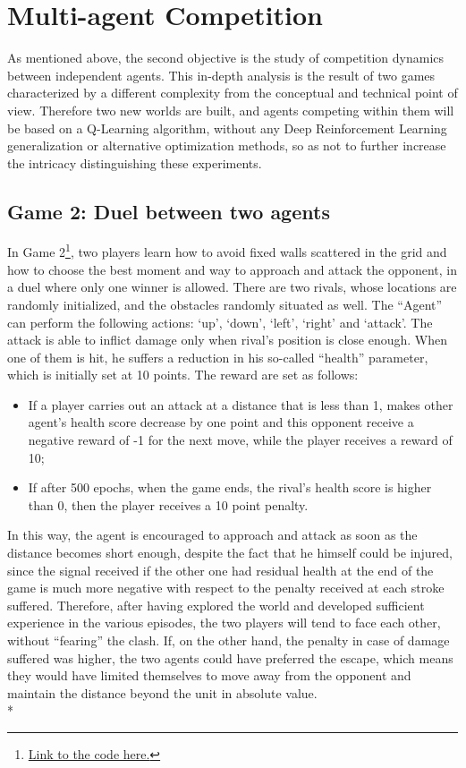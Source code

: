 \section{Multi-agent Competition}
As mentioned above, the second objective is the study of competition dynamics between independent agents. This in-depth analysis is the result of two games characterized by a different complexity from the conceptual and technical point of view. Therefore two new worlds are built, and agents competing within them will be based on a Q-Learning algorithm, without any Deep Reinforcement Learning generalization or alternative optimization methods, so as not to further increase the intricacy distinguishing these experiments.
\subsection{Game 2: Duel between two agents}
In Game 2\footnote{\href{https://github.com/moiraghif/DragonHunting/tree/master/Duel}{Link to the code here.}}, two players learn how to avoid fixed walls scattered in the grid and how to choose the best moment and way to approach and attack the opponent, in a duel where only one winner is allowed. There are two rivals, whose locations are randomly initialized, and the obstacles randomly situated as well. 
The ``Agent'' can perform the following actions: `up', `down', `left', `right' and `attack'. The attack is able to inflict damage only when rival's position is close enough. When one of them is hit, he suffers a reduction in his so-called ``health'' parameter, which is initially set at 10 points. The reward are set as follows:
\begin{itemize}[noitemsep, topsep=0ex]
  \item If a player carries out an attack at a distance that is less than 1, makes other agent's health score decrease by one point and this opponent receive a negative reward of -1 for the next move, while the player receives a reward of 10;
  \item If after 500 epochs, when the game ends, the rival's health score is higher than 0, then the player receives a 10 point penalty.
\end{itemize}
In this way, the agent is encouraged to approach and attack as soon as the distance becomes short enough, despite the fact that he himself could be injured, since the signal received if the other one had residual health at the end of the game is much more negative with respect to the penalty received at each stroke suffered. Therefore, after having explored the world and developed sufficient experience in the various episodes, the two players will tend to face each other, without ``fearing'' the clash. If, on the other hand, the penalty in case of damage suffered was higher, the two agents could have preferred the escape, which means they would have limited themselves to move away from the opponent and maintain the distance beyond the unit in absolute value.\\*
